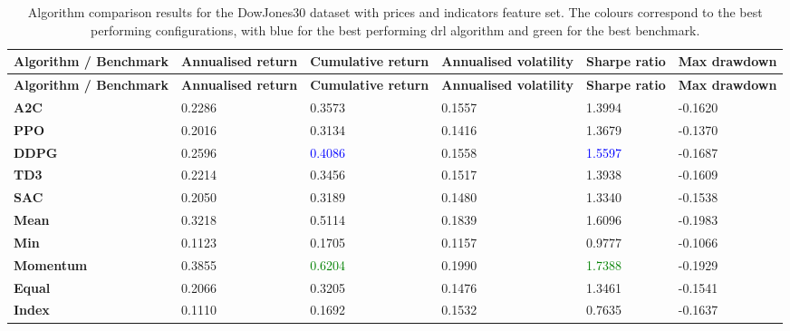 \begin{longtable}{|p{2cm}|p{2.1cm}|p{2.1cm}|p{2.1cm}|p{1.5cm}|p{2cm}|}
    \caption{Algorithm comparison results for the DowJones30 dataset with prices and indicators feature set. The colours correspond to the best performing configurations, with blue for the best performing \acrshort{drl} algorithm and green for the best benchmark.}
    \label{tab:experiment_algorithms_dow30} 
    \\ 
    \hline
    \textbf{Algorithm / Benchmark} & \textbf{Annualised return} & \textbf{Cumulative return} & \textbf{Annualised volatility} & \textbf{Sharpe ratio} & \textbf{Max drawdown}  \\ \midrule
    \endfirsthead

    \hline
    \textbf{Algorithm / Benchmark} & \textbf{Annualised return} & \textbf{Cumulative return} & \textbf{Annualised volatility} & \textbf{Sharpe ratio} & \textbf{Max drawdown}  \\ \midrule
    \endhead

    \endfoot
    \hline

    \textbf{A2C} & 0.2286 & 0.3573 & 0.1557 & 1.3994 & -0.1620 \\ \hline
    \textbf{PPO} & 0.2016 & 0.3134 & 0.1416 & 1.3679 & -0.1370 \\ \hline
    \textbf{DDPG} & 0.2596 & \textcolor{blue}{0.4086} & 0.1558 & \textcolor{blue}{1.5597} & -0.1687 \\ \hline
    \textbf{TD3} & 0.2214 & 0.3456 & 0.1517 & 1.3938 & -0.1609 \\ \hline
    \textbf{SAC} & 0.2050 & 0.3189 & 0.1480 & 1.3340 & -0.1538 \\ \midrule
    \textbf{Mean} & 0.3218 & 0.5114 & 0.1839 & 1.6096 & -0.1983 \\ \hline
    \textbf{Min} & 0.1123 & 0.1705 & 0.1157 & 0.9777 & -0.1066 \\ \hline
    \textbf{Momentum} & 0.3855 & \textcolor{green}{0.6204} & 0.1990 & \textcolor{green}{1.7388} & -0.1929 \\ \hline
    \textbf{Equal} & 0.2066 & 0.3205 & 0.1476 & 1.3461 & -0.1541 \\ \hline
    \textbf{Index} & 0.1110 & 0.1692 & 0.1532 & 0.7635 & -0.1637 \\ \hline
\end{longtable}